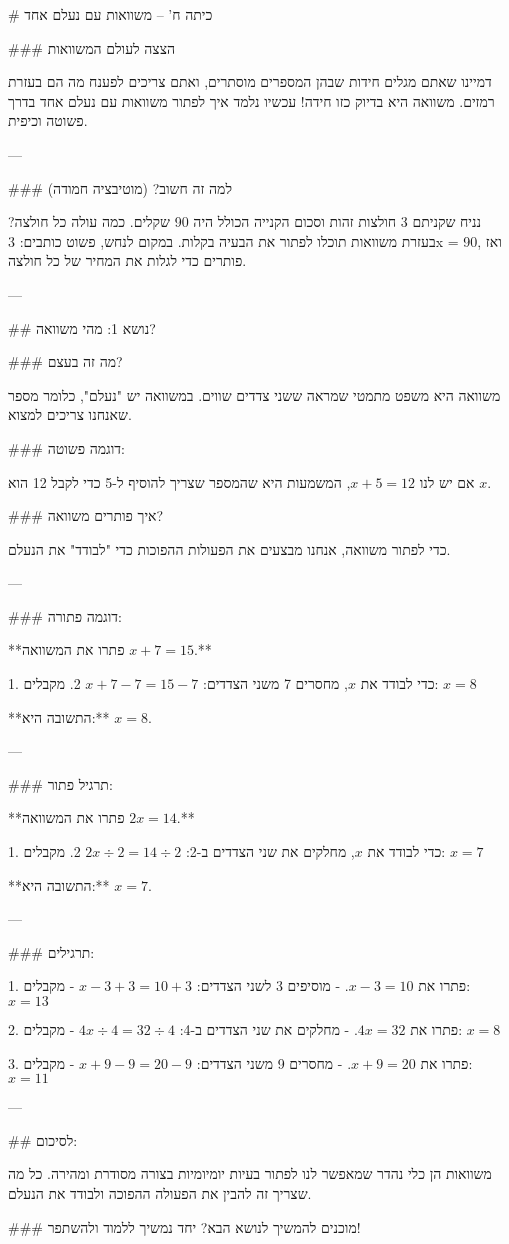 # כיתה ח' – משוואות עם נעלם אחד

### הצצה לעולם המשוואות

דמיינו שאתם מגלים חידות שבהן המספרים מוסתרים, ואתם צריכים לפענח מה הם בעזרת רמזים. משוואה היא בדיוק כזו חידה! עכשיו נלמד איך לפתור משוואות עם נעלם אחד בדרך פשוטה וכיפית.

---

### למה זה חשוב? (מוטיבציה חמודה)

נניח שקניתם 3 חולצות זהות וסכום הקנייה הכולל היה 90 שקלים. כמה עולה כל חולצה? בעזרת משוואות תוכלו לפתור את הבעיה בקלות. במקום לנחש, פשוט כותבים: 3x = 90, ואז פותרים כדי לגלות את המחיר של כל חולצה.

---

## נושא 1: מהי משוואה?

### מה זה בעצם?

משוואה היא משפט מתמטי שמראה ששני צדדים שווים. במשוואה יש "נעלם", כלומר מספר שאנחנו צריכים למצוא.

### דוגמה פשוטה:

אם יש לנו $x + 5 = 12$, המשמעות היא שהמספר שצריך להוסיף ל-5 כדי לקבל 12 הוא $x$. 

### איך פותרים משוואה?

כדי לפתור משוואה, אנחנו מבצעים את הפעולות ההפוכות כדי "לבודד" את הנעלם.

---

### דוגמה פתורה:

**פתרו את המשוואה $x + 7 = 15$.**

1. כדי לבודד את $x$, מחסרים 7 משני הצדדים:
   $x + 7 - 7 = 15 - 7$
2. מקבלים: $x = 8$

**התשובה היא:** $x = 8$.

---

### תרגיל פתור:

**פתרו את המשוואה $2x = 14$.**

1. כדי לבודד את $x$, מחלקים את שני הצדדים ב-2:
   $2x \div 2 = 14 \div 2$
2. מקבלים: $x = 7$

**התשובה היא:** $x = 7$.

---

### תרגילים:

1. פתרו את $x - 3 = 10$.
   - מוסיפים 3 לשני הצדדים: $x - 3 + 3 = 10 + 3$
   - מקבלים: $x = 13$

2. פתרו את $4x = 32$.
   - מחלקים את שני הצדדים ב-4: $4x \div 4 = 32 \div 4$
   - מקבלים: $x = 8$

3. פתרו את $x + 9 = 20$.
   - מחסרים 9 משני הצדדים: $x + 9 - 9 = 20 - 9$
   - מקבלים: $x = 11$

---

## לסיכום:

משוואות הן כלי נהדר שמאפשר לנו לפתור בעיות יומיומיות בצורה מסודרת ומהירה. כל מה שצריך זה להבין את הפעולה ההפוכה ולבודד את הנעלם.

### מוכנים להמשיך לנושא הבא? יחד נמשיך ללמוד ולהשתפר!

